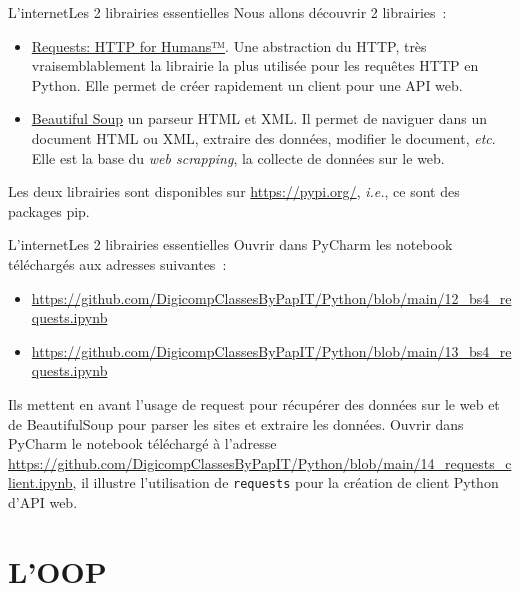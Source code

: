 \documentclass{beamer}
\begin{document}
    \begin{frame}{L'internet}{Les 2 librairies essentielles}
        Nous allons découvrir 2 librairies~:
        \begin{itemize}
            \item \href{https://requests.readthedocs.io/en/latest/}{Requests: HTTP for Humans™}.
            Une abstraction du HTTP, très vraisemblablement la librairie la plus utilisée pour les requêtes HTTP en Python.
            Elle permet de créer rapidement un client pour une API web.
            \item \href{https://www.crummy.com/software/BeautifulSoup/bs4/doc/}{Beautiful Soup} un parseur HTML et XML.
            Il permet de naviguer dans un document HTML ou XML, extraire des données, modifier le document, \textit{etc}.
            Elle est la base du \textit{web scrapping}, la collecte de données sur le web.
        \end{itemize}
        \bigbreak
        Les deux librairies sont disponibles sur \url{https://pypi.org/}, \textit{i.e.}, ce sont des packages pip.
    \end{frame}

    \begin{frame}{L'internet}{Les 2 librairies essentielles}
        Ouvrir dans PyCharm les notebook téléchargés aux adresses suivantes~:
        \begin{itemize}
            \item \url{https://github.com/DigicompClassesByPapIT/Python/blob/main/12_bs4_requests.ipynb}
            \item \url{https://github.com/DigicompClassesByPapIT/Python/blob/main/13_bs4_requests.ipynb}
        \end{itemize}
        Ils mettent en avant l'usage de request pour récupérer des données sur le web et de BeautifulSoup pour parser les sites et extraire les données.
        \bigbreak
        Ouvrir dans PyCharm le notebook téléchargé à l'adresse \url{https://github.com/DigicompClassesByPapIT/Python/blob/main/14_requests_client.ipynb}, il illustre l'utilisation de \lstinline{requests} pour la création de client Python d'API web.
    \end{frame}


    \section{L'OOP}\label{sec:oop}
\end{document}
